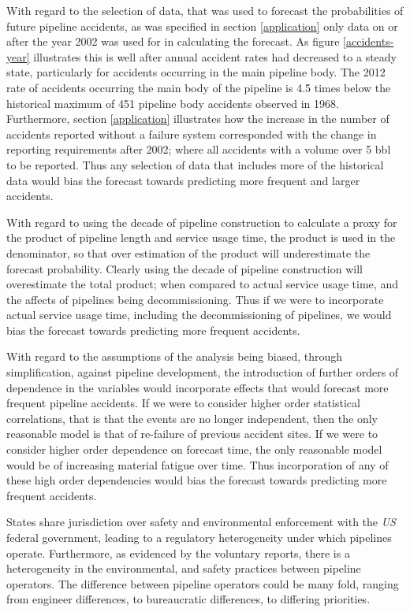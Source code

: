 \documentclass[letterpaper,10pt,oneside,final,onecolumn]{article}
\begin{document}
	With regard to the selection of data, that was used to forecast the probabilities of future pipeline accidents, as was specified in section \ref{application} only data on or after the year 2002 was used for in calculating the forecast.
	As figure \ref{accidents-year} illustrates this is well after annual accident rates had decreased to a steady state, particularly for accidents occurring in the main pipeline body.
	The 2012 rate of accidents occurring the main body of the pipeline is 4.5 times below the historical maximum of 451 pipeline body accidents observed in 1968.
	Furthermore, section \ref{application} illustrates how the increase in the number of accidents reported without a failure system corresponded with the change in reporting requirements after 2002; where all accidents with a volume over 5 bbl to be reported.
	Thus any selection of data that includes more of the historical data would bias the forecast towards predicting more frequent and larger accidents.

	With regard to using the decade of pipeline construction to calculate a proxy for the product of pipeline length and service usage time, the product is used in the denominator, so that over estimation of the product will underestimate the forecast probability.
	Clearly using the decade of pipeline construction will overestimate the total product; when compared to actual service usage time, and the affects of pipelines being decommissioning.
	Thus if we were to incorporate actual service usage time, including the decommissioning of pipelines, we would bias the forecast towards predicting more frequent accidents.

	With regard to the assumptions of the analysis being biased, through simplification, against pipeline development, the introduction of further orders of dependence in the variables would incorporate effects that would forecast more frequent pipeline accidents.
	If we were to consider higher order statistical correlations, that is that the events are no longer independent, then the only reasonable model is that of re-failure of previous accident sites.
	If we were to consider higher order dependence on forecast time, the only reasonable model would be of increasing material fatigue over time.
	Thus incorporation of any of these high order dependencies would bias the forecast towards predicting more frequent accidents.

	States share jurisdiction over safety and environmental enforcement with the \textit{US} federal government, leading to a regulatory heterogeneity under which pipelines operate.
	Furthermore, as evidenced by the voluntary reports, there is a heterogeneity in the environmental, and safety practices between pipeline operators.
	The difference between pipeline operators could be many fold, ranging from engineer differences, to bureaucratic differences, to differing priorities.
\end{document}
